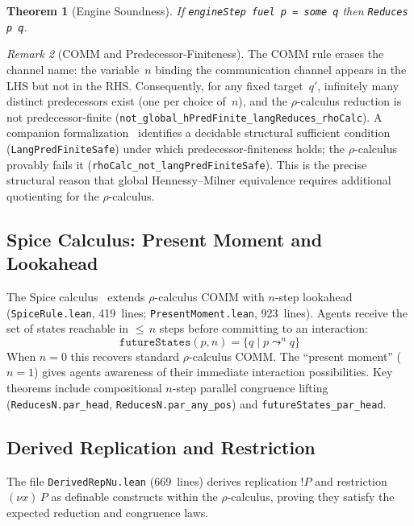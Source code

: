 \documentclass[11pt]{article}
\newtheorem{theorem}{Theorem}[section]
\theoremstyle{definition}
\theoremstyle{remark}
\newtheorem{remark}[theorem]{Remark}
\begin{document}
\begin{theorem}[Engine Soundness]
If \texttt{engineStep fuel p = some q} then \texttt{Reduces p q}.
\end{theorem}

\begin{remark}[COMM and Predecessor-Finiteness]
The COMM rule erases the channel name: the variable~$n$ binding the
communication channel appears in the LHS but not in the RHS.
Consequently, for any fixed target~$q'$, infinitely many distinct
predecessors exist (one per choice of~$n$), and the
$\rho$-calculus reduction is not predecessor-finite
(\texttt{not\_global\_hPredFinite\_langReduces\_rhoCalc}).
A companion formalization~\cite{leanOSLF2025} identifies a decidable
structural sufficient condition (\texttt{LangPredFiniteSafe}) under which
predecessor-finiteness holds; the $\rho$-calculus provably fails it
(\texttt{rhoCalc\_not\_langPredFiniteSafe}).
This is the precise structural reason that global Hennessy--Milner
equivalence requires additional quotienting for the $\rho$-calculus.
\end{remark}

\subsection{Spice Calculus: Present Moment and Lookahead}

The Spice calculus~\cite{MeredithPresentMoment2026} extends $\rho$-calculus
COMM with $n$-step lookahead (\texttt{SpiceRule.lean}, 419~lines;
\texttt{PresentMoment.lean}, 923~lines).  Agents receive the set of
states reachable in ${\leq}\, n$ steps before committing to an
interaction:
\[
  \texttt{futureStates}(p, n) = \{q \mid p \leadsto^n q\}
\]
When $n = 0$ this recovers standard $\rho$-calculus COMM.  The ``present
moment'' ($n = 1$) gives agents awareness of their immediate interaction
possibilities.  Key theorems include compositional $n$-step parallel
congruence lifting (\texttt{ReducesN.par\_head},
\texttt{ReducesN.par\_any\_pos}) and
\texttt{futureStates\_par\_head}.

\subsection{Derived Replication and Restriction}

The file \texttt{DerivedRepNu.lean} (669~lines) derives replication
$!P$ and restriction $(\nu x)\, P$ as definable constructs within
the $\rho$-calculus, proving they satisfy the expected reduction and
congruence laws.
\end{document}
